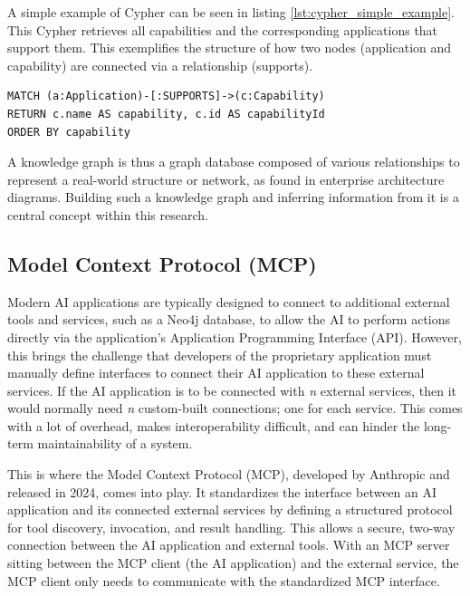 A simple example of Cypher can be seen in listing \ref{lst:cypher_simple_example}. This Cypher retrieves all capabilities and the corresponding applications that support them. This exemplifies the structure of how two nodes (application and capability) are connected via a relationship (supports).

\begin{lstlisting}[style=cypherstyle, label={lst:cypher_simple_example},caption={A simple Cypher example to retrieve the capabilities supported by applications.}]
MATCH (a:Application)-[:SUPPORTS]->(c:Capability)
RETURN c.name AS capability, c.id AS capabilityId
ORDER BY capability
\end{lstlisting}

A knowledge graph is thus a graph database composed of various relationships to represent a real-world structure or network, as found in enterprise architecture diagrams. \cite{wang2017knowledge} Building such a knowledge graph and inferring information from it is a central concept within this research.

\subsection{Model Context Protocol (MCP)}
\label{sub:background:mcp}
Modern AI applications are typically designed to connect to additional external tools and services, such as a Neo4j database, to allow the AI to perform actions directly via the application's Application Programming Interface (API). However, this brings the challenge that developers of the proprietary application must manually define interfaces to connect their AI application to these external services. If the AI application is to be connected with \textit{n} external services, then it would normally need \textit{n} custom-built connections; one for each service. This comes with a lot of overhead, makes interoperability difficult, and can hinder the long-term maintainability of a system. \cite{hou2025model, anthropic_mcp_2025}

This is where the Model Context Protocol (MCP), developed by Anthropic and released in 2024, comes into play. It standardizes the interface between an AI application and its connected external services by defining a structured protocol for tool discovery, invocation, and result handling. This allows a secure, two-way connection between the AI application and external tools. \cite{anthropic_mcp_2025} With an MCP server sitting between the MCP client (the AI application) and the external service, the MCP client only needs to communicate with the standardized MCP interface. \cite{hou2025model}

